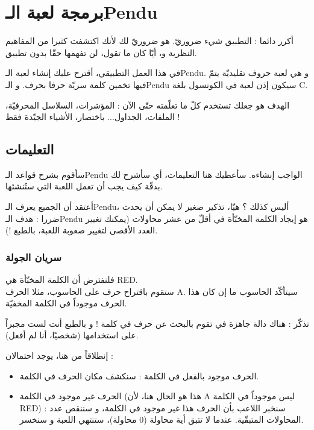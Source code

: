 \chapter{برمجة لعبة
الـ\textenglish{Pendu}}
أكرر دائما : التطبيق شيء ضروريّ. هو ضروريّ لك لأنك اكتشفت كثيرا من المفاهيم النظرية و، أيّا كان ما تقول، لن تفهمها حقّا بدون تطبيق.

في هذا العمل التطبيقي، أقترح عليك إنشاء لعبة الـ\textenglish{Pendu}.
و هي لعبة حروف تقليديّة يتمّ فيها تخمين كلمة سريّة حرفا بحرف. و الـ\textenglish{Pendu}
سيكون إذن لعبة في الكونسول بلغة
\textenglish{C}.

الهدف هو جعلك تستخدم كلّ ما تعلّمته حتّى الآن : المؤشرات، السلاسل المحرفيّة، الملفات، الجداول... باختصار، الأشياء الجيّدة فقط !

\section{التعليمات}
سأقوم بشرح قواعد الـ\textenglish{Pendu}
الواجب إنشاءه. سأعطيك هنا التعليمات، أي سأشرح لك بدقّة كيف يجب أن تعمل اللعبة التي ستُنشئها.

أعتقد أن الجميع يعرف
الـ\textenglish{Pendu}،
أليس كذلك ؟ هيّا، تذكير صغير لا يمكن أن يحدث ضررا : هدف الـ\textenglish{Pendu}
هو إيجاد الكلمة المخبّأة في أقلّ من عشر محاولات (يمكنك تغيير العدد الأقصى لتغيير صعوبة اللعبة، بالطبع !).

\subsection{سريان الجولة}
فلنفترض أن الكلمة المخبّأة هي \textenglish{RED}.\\
ستقوم باقتراح حرف على الحاسوب، مثلا الحرف
\textenglish{A}.
سيتأكّد الحاسوب ما إن كان هذا الحرف موجوداً في الكلمة المخفيّة.

\begin{information}
تذكّر : هناك دالة جاهزة في
تقوم بالبحث عن حرف في كلمة ! و بالطبع أنت لست مجبراً على استخدامها (شخصيّا، أنا لم أفعل).
\end{information}

إنطلاقاً من هنا، يوجد احتمالان :
\begin{itemize}
  \item الحرف موجود بالفعل في الكلمة : سنكشف مكان الحرف في الكلمة.
  \item الحرف غير موجود في الكلمة (هذا هو الحال هنا، لأن
\textenglish{A}
ليس موجوداً في الكلمة
\textenglish{RED}) :
سنخبر اللاعب بأن الحرف هذا غير موجود في الكلمة، و سننقص عدد المحاولات المتبقّية. عندما لا تتبق أية محاولة (0 محاولة)، ستنتهي اللعبة و سنخسر.
\end{itemize}

